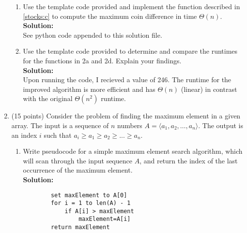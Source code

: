 \documentclass[12pt]{article}
\begin{document}
\begin{enumerate}
\begin{enumerate}
		\item \label{stocks:d} Use the template code provided and implement the function described in \eqref{stocks:c} to compute the maximum coin difference in time $\Theta(n)$.\\
		{\bf{Solution:}}\\
			See python code appended to this solution file.

		\item \label{stocks:e} Use the template code provided to determine and compare the runtimes for the functions in 2a and 2d. Explain your findings.\\
		{\bf{Solution:}}\\
			Upon running the code, I recieved a value of 246. 
			The runtime for the improved algorithm is more efficient and has $\Theta(n)$ (linear) in contrast with the original $\Theta(n^2)$ runtime.
		\end{enumerate}

		\pagebreak

		\item (15 points) Consider the problem of finding the maximum element in a given array. The input is a sequence of $n$ numbers $A=\langle a_{1},a_{2},\dots,a_{n}\rangle$. The output is an index $i$ such that $a_{i} \geq a_{1} \geq a_{2} \geq ... \geq a_{n}$.

		\begin{enumerate}
		\item Write pseudocode for a simple maximum element search algorithm, which will scan through the input sequence $A$, and return the index of the last occurrence of the maximum element.\\
		{\bf{Solution:}}
		\begin{small}
		\begin{verbatim}
		set maxElement to A[0]
		for i = 1 to len(A) - 1
			if A[i] > maxElement
				maxElement=A[i]
		return maxElement
		\end{verbatim}
		\end{small}


\end{enumerate}
\end{enumerate}
\end{document}
